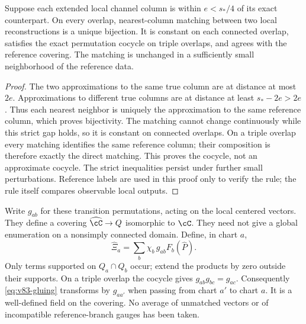 \begin{lemma}
\label{lem:v83-match}
Suppose each extended local channel column is within $e<s_*/4$ of
its exact counterpart. On every overlap, nearest-column matching
between two local reconstructions is a unique bijection. It is
constant on each connected overlap, satisfies the exact permutation
cocycle on triple overlaps, and agrees with the reference covering.
The matching is unchanged in a sufficiently small neighborhood of the
reference data.
\end{lemma}
\begin{proof}
The two approximations to the same true column are at distance at
most $2e$. Approximations to different true columns are at distance
at least $s_*-2e>2e$. Thus each nearest neighbor is uniquely the
approximation to the same reference column, which proves bijectivity.
The matching cannot change continuously while this strict gap holds,
so it is constant on connected overlaps. On a triple overlap every
matching identifies the same reference column; their composition is
therefore exactly the direct matching. This proves the cocycle, not
an approximate cocycle. The strict inequalities persist under further
small perturbations. Reference labels are used in this proof only
to verify the rule; the rule itself compares observable local outputs.
\end{proof}

Write $g_{ab}$ for these transition permutations, acting on the local
centered vectors. They define a covering $\widehat\cC\to Q$
isomorphic to $\cC$. They need not give a global enumeration on a
nonsimply connected domain. Define, in chart $a$,
\begin{equation}\label{eq:v83-gluing}
 \widehat\Xi_a=\sum_b\chi_b\,g_{ab}F_b(\widehat P).
\end{equation}
Only terms supported on $Q_a\cap Q_b$ occur; extend the products
by zero outside their supports. On a triple overlap the cocycle gives
$g_{ab}g_{bc}=g_{ac}$. Consequently \eqref{eq:v83-gluing}
transforms by $g_{aa'}$ when passing from chart $a'$ to chart $a$.
It is a well-defined field on the covering. No average of unmatched
vectors or of incompatible reference-branch gauges has been taken.

